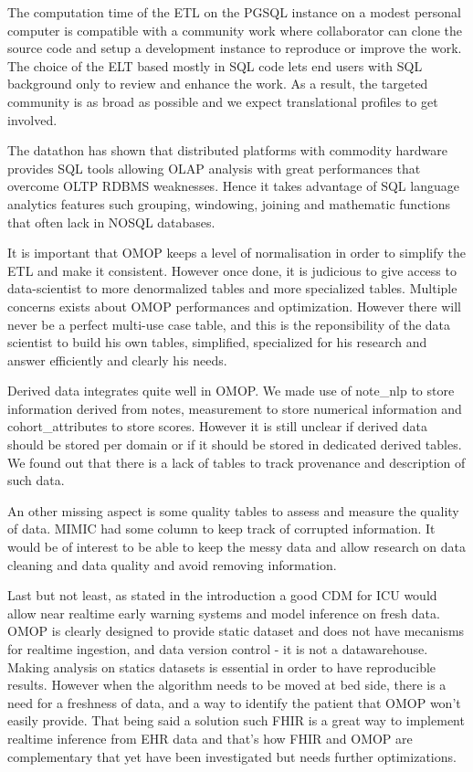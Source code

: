 The computation time of the ETL on the PGSQL instance on a modest personal
computer is compatible with a community work where collaborator can clone the
source code and setup a development instance to reproduce or improve the work.
The choice of the ELT based mostly in SQL code lets end users with SQL
background only to review and enhance the work. As a result, the targeted
community is as broad as possible and we expect translational profiles to get
involved.

The datathon has shown that distributed platforms with commodity hardware
provides SQL tools allowing OLAP analysis with great performances that overcome
OLTP RDBMS weaknesses. Hence it takes advantage of SQL language analytics
features such grouping, windowing, joining and mathematic functions that often
lack in NOSQL databases.

It is important that OMOP keeps a level of normalisation in order to simplify
the ETL and make it consistent. However once done, it is judicious to give
access to data-scientist to more denormalized tables and more specialized
tables. Multiple concerns exists about OMOP performances and optimization.
However there will never be a perfect multi-use case table, and this is the
reponsibility of the data scientist to build his own tables, simplified,
specialized for his research and answer efficiently and clearly his needs.

Derived data integrates quite well in OMOP. We made use of note\_nlp to store
information derived from notes, measurement to store numerical information and
cohort\_attributes to store scores. However it is still unclear if derived data
should be stored per domain or if it should be stored in dedicated derived
tables. We found out that there is a lack of tables to track provenance and
description of such data.

An other missing aspect is some quality tables to assess and measure the
quality of data. MIMIC had some column to keep track of corrupted information.
It would be of interest to be able to keep the messy data and allow research on
data cleaning and data quality and avoid removing information.

Last but not least, as stated in the introduction a good CDM for ICU would
allow near realtime early warning systems and model inference on fresh data.
OMOP is clearly designed to provide static dataset and does not have mecanisms
for realtime ingestion, and data version control - it is not a datawarehouse.
Making analysis on statics datasets is essential in order to have reproducible
results. However when the algorithm needs to be moved at bed side, there is a
need for a freshness of data, and a way to identify the patient that OMOP won't
easily provide. That being said a solution such FHIR is a great way to
implement realtime inference from EHR data and that's how FHIR and OMOP are
complementary that yet have been investigated \cite{gatech} but needs further
optimizations.

